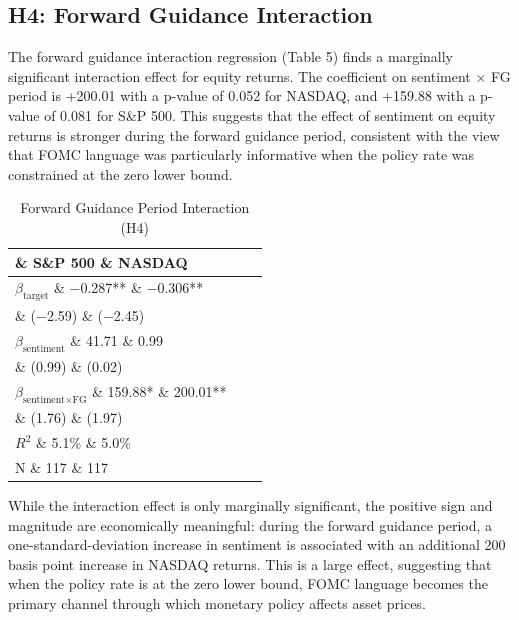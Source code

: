 \subsection{H4: Forward Guidance Interaction}

The forward guidance interaction regression (Table 5) finds a marginally significant interaction effect for equity returns. The coefficient on sentiment × FG period is +200.01 with a p-value of 0.052 for NASDAQ, and +159.88 with a p-value of 0.081 for S\&P 500. This suggests that the effect of sentiment on equity returns is stronger during the forward guidance period, consistent with the view that FOMC language was particularly informative when the policy rate was constrained at the zero lower bound.


\begin{table}[htbp]
\centering
\caption{Forward Guidance Period Interaction (H4)}
\label{tab:h4}
\begin{tabular}{lcc}
\toprule
 \& S\&P 500 \& NASDAQ \\
\midrule
$\beta_{\text{target}}$ \& $-$0.287** \& $-$0.306** \\
 \& ($-$2.59) \& ($-$2.45) \\
$\beta_{\text{sentiment}}$ \& 41.71 \& 0.99 \\
 \& (0.99) \& (0.02) \\
$\beta_{\text{sentiment} \times \text{FG}}$ \& 159.88* \& 200.01** \\
 \& (1.76) \& (1.97) \\
\midrule
$R^2$ \& 5.1\% \& 5.0\% \\
N \& 117 \& 117 \\
\bottomrule
\end{tabular}
\par\vspace{2pt}{\footnotesize Newey-West HAC standard errors with lag=4. t-statistics in parentheses. ** $p < 0.05$, * $p < 0.10$. FG = forward guidance period indicator (Dec 2008--Dec 2015).}
\end{table}


While the interaction effect is only marginally significant, the positive sign and magnitude are economically meaningful: during the forward guidance period, a one-standard-deviation increase in sentiment is associated with an additional 200 basis point increase in NASDAQ returns. This is a large effect, suggesting that when the policy rate is at the zero lower bound, FOMC language becomes the primary channel through which monetary policy affects asset prices.


